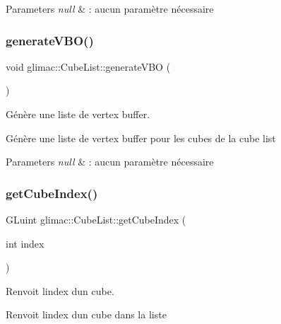 \begin{DoxyParams}{Parameters}
{\em null} & \+: aucun paramètre nécessaire \\
\hline
\end{DoxyParams}
\mbox{\label{classglimac_1_1CubeList_a7fc99dde6285a3b0ffc14b86f9844edc}} 
\subsubsection{\texorpdfstring{generate\+V\+B\+O()}{generateVBO()}}
{\footnotesize\ttfamily void glimac\+::\+Cube\+List\+::generate\+V\+BO (\begin{DoxyParamCaption}{ }\end{DoxyParamCaption})}



Génère une liste de vertex buffer. 

Génère une liste de vertex buffer pour les cubes de la cube list


\begin{DoxyParams}{Parameters}
{\em null} & \+: aucun paramètre nécessaire \\
\hline
\end{DoxyParams}
\mbox{\label{classglimac_1_1CubeList_a478146f5afac2969a3ad1ac698f82233}} 
\subsubsection{\texorpdfstring{get\+Cube\+Index()}{getCubeIndex()}}
{\footnotesize\ttfamily G\+Luint glimac\+::\+Cube\+List\+::get\+Cube\+Index (\begin{DoxyParamCaption}\item[{int}]{index }\end{DoxyParamCaption})\hspace{0.3cm}{\ttfamily [inline]}}



Renvoit l\textquotesingle{}index d\textquotesingle{}un cube. 

Renvoit l\textquotesingle{}index d\textquotesingle{}un cube dans la liste


